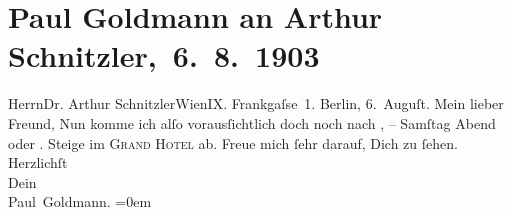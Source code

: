 

         
         \renewcommand{\erwaehntePersonen}{Personen: Paul Goldmann}
         \renewcommand{\erwaehnteOrte}{Orte: Berlin, Frankgasse 1, Grand Hotel Wien, Wien}
         \renewcommand{\erwaehnteWerke}{}
               \section[ Paul Goldmann an Arthur Schnitzler, 6. 8. 1903]{ Paul Goldmann an Arthur Schnitzler, 6. 8. 1903}\nopagebreak{}\rehead{ }\begin{ledgroupsized}[t]{13cm}\normalsize\beginnumbering \toendnotes[C]{\smallbreak\pagebreak[2]} 
\toendnotes[C]{\smallbreak}\pstart{}{\pb}Herrn\pend{}\pstart{}Dr. Arthur Schnitzler\pend{}\pstart{}Wien\pend{}\pstart{}IX. Frankgaſse 1.\pend{}{\bigskip}\pstart
           {\pb}Berlin, 6. Auguſt.\pend
           \pstart{}Mein lieber Freund,\pend\pstart
           Nun komme ich alſo vorausſichtlich doch noch nach \label{K_L03381-1v}\label{K_L03381-1h}, – Samſtag{ }Abend oder \label{K_L03381-2v}\label{K_L03381-2h}.
               Steige im \textsc{Grand Hotel} ab. Freue mich ſehr darauf, Dich zu ſehen.\pend
           \pstart
           Herzlichſt {\\[\baselineskip]}Dein {\\[\baselineskip]}\spacefill\mbox{Paul Goldmann.}\pend
           \leftskip=0em{}
         
         \endnumbering{}\end{ledgroupsized}  \newcommand{\dateiname}{L03381}\newcommand{\titel}{Paul Goldmann an Arthur Schnitzler, 6. 8. 1903}\newcommand{\editorInnen}{Martin Anton Müller und Laura Untner}
      